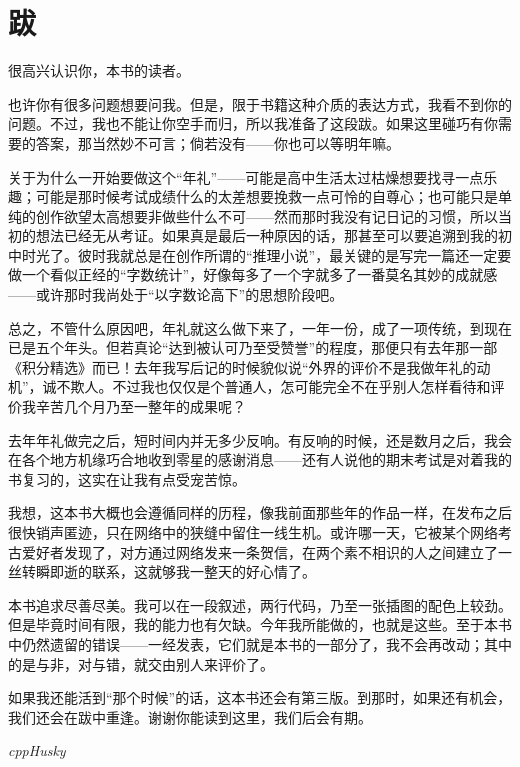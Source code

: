\chapter*{跋}
很高兴认识你，本书的读者。\par
也许你有很多问题想要问我。但是，限于书籍这种介质的表达方式，我看不到你的问题。不过，我也不能让你空手而归，所以我准备了这段跋。如果这里碰巧有你需要的答案，那当然妙不可言；倘若没有——你也可以等明年嘛。\par
关于为什么一开始要做这个``年礼''——可能是高中生活太过枯燥想要找寻一点乐趣；可能是那时候考试成绩什么的太差想要挽救一点可怜的自尊心；也可能只是单纯的创作欲望太高想要非做些什么不可——然而那时我没有记日记的习惯，所以当初的想法已经无从考证。如果真是最后一种原因的话，那甚至可以要追溯到我的初中时光了。彼时我就总是在创作所谓的``推理小说''，最关键的是写完一篇还一定要做一个看似正经的``字数统计''，好像每多了一个字就多了一番莫名其妙的成就感——或许那时我尚处于``以字数论高下''的思想阶段吧。\par
总之，不管什么原因吧，年礼就这么做下来了，一年一份，成了一项传统，到现在已是五个年头。但若真论``达到被认可乃至受赞誉''的程度，那便只有去年那一部《积分精选》而已！去年我写后记的时候貌似说``外界的评价不是我做年礼的动机''，诚不欺人。不过我也仅仅是个普通人，怎可能完全不在乎别人怎样看待和评价我辛苦几个月乃至一整年的成果呢？\par
去年年礼做完之后，短时间内并无多少反响。有反响的时候，还是数月之后，我会在各个地方机缘巧合地收到零星的感谢消息——还有人说他的期末考试是对着我的书复习的，这实在让我有点受宠苦惊。\par
我想，这本书大概也会遵循同样的历程，像我前面那些年的作品一样，在发布之后很快销声匿迹，只在网络中的狭缝中留住一线生机。或许哪一天，它被某个网络考古爱好者发现了，对方通过网络发来一条贺信，在两个素不相识的人之间建立了一丝转瞬即逝的联系，这就够我一整天的好心情了。\par
本书追求尽善尽美。我可以在一段叙述，两行代码，乃至一张插图的配色上较劲。但是毕竟时间有限，我的能力也有欠缺。今年我所能做的，也就是这些。至于本书中仍然遗留的错误——一经发表，它们就是本书的一部分了，我不会再改动；其中的是与非，对与错，就交由别人来评价了。\par
如果我还能活到``那个时候''的话，这本书还会有第三版。到那时，如果还有机会，我们还会在跋中重逢。谢谢你能读到这里，我们后会有期。\par
\begin{flushright}\textit{cppHusky}\end{flushright}
